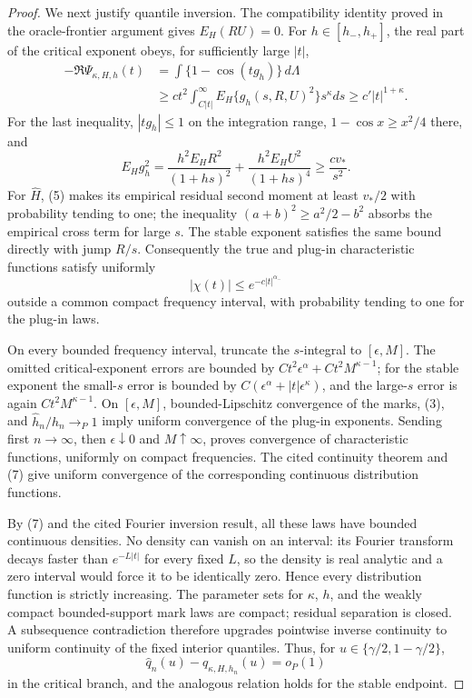 \documentclass{article}
\begin{document}
\begin{proof}
We next justify quantile inversion.  The compatibility identity proved in the oracle-frontier argument gives \(E_H(RU)=0\).  For \(h\in[h_-,h_+]\), the real part of the critical exponent obeys, for sufficiently large \(|t|\),
\[
\begin{split}
 -\Re\Psi_{\kappa,H,h}(t)
 &=\int\{1-\cos(tg_h)\}\,d\Lambda\\
 &\geq c t^2\int_{C|t|}^\infty E_H\{g_h(s,R,U)^2\}s^\kappa ds
 \geq c'|t|^{1+\kappa}.
\end{split} \tag{6}
\]
For the last inequality, \(|tg_h|\leq1\) on the integration range, \(1-\cos x\geq x^2/4\) there, and
\[
 E_Hg_h^2=\frac{h^2E_HR^2}{(1+hs)^2}
 +\frac{h^2E_HU^2}{(1+hs)^4}
 \geq \frac{c v_*}{s^2}.
\]
For \(\widehat H\), (5) makes its empirical residual second moment at least \(v_*/2\) with probability tending to one; the inequality \((a+b)^2\geq a^2/2-b^2\) absorbs the empirical cross term for large \(s\).  The stable exponent satisfies the same bound directly with jump \(R/s\).  Consequently the true and plug-in characteristic functions satisfy uniformly
\[
 |\chi(t)|\leq e^{-c|t|^{\alpha_-}} \tag{7}
\]
outside a common compact frequency interval, with probability tending to one for the plug-in laws.

On every bounded frequency interval, truncate the \(s\)-integral to \([\epsilon,M]\).  The omitted critical-exponent errors are bounded by \(C t^2\epsilon^\alpha+Ct^2M^{\kappa-1}\); for the stable exponent the small-\(s\) error is bounded by \(C(\epsilon^\alpha+|t|\epsilon^\kappa)\), and the large-\(s\) error is again \(Ct^2M^{\kappa-1}\).  On \([\epsilon,M]\), bounded-Lipschitz convergence of the marks, (3), and \(\widehat h_n/h_n\to_P1\) imply uniform convergence of the plug-in exponents.  Sending first \(n\to\infty\), then \(\epsilon\downarrow0\) and \(M\uparrow\infty\), proves convergence of characteristic functions, uniformly on compact frequencies.  The cited continuity theorem and (7) give uniform convergence of the corresponding continuous distribution functions.

By (7) and the cited Fourier inversion result, all these laws have bounded continuous densities.  No density can vanish on an interval: its Fourier transform decays faster than \(e^{-L|t|}\) for every fixed \(L\), so the density is real analytic and a zero interval would force it to be identically zero.  Hence every distribution function is strictly increasing.  The parameter sets for \(\kappa\), \(h\), and the weakly compact bounded-support mark laws are compact; residual separation is closed.  A subsequence contradiction therefore upgrades pointwise inverse continuity to uniform continuity of the fixed interior quantiles.  Thus, for \(u\in\{\gamma/2,1-\gamma/2\}\),
\[
 \widehat q_n(u)-q_{\kappa,H,h_n}(u)=o_P(1) \tag{8}
\]
in the critical branch, and the analogous relation holds for the stable endpoint.


\end{proof}
\end{document}
